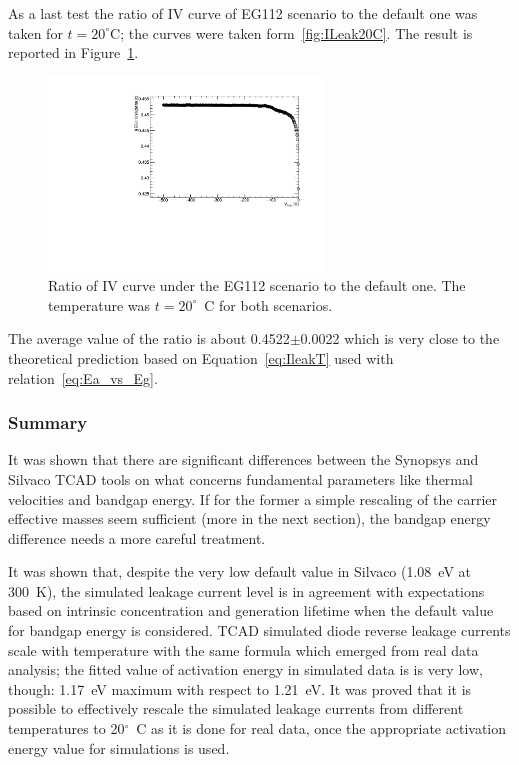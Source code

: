As  a last test the ratio of IV curve of EG112 scenario to the default one was taken for 
$t=20^{\circ}$C; the curves were taken form~\ref{fig:ILeak20C}. The result is reported in Figure~\ref{fig:EG112_to_default_T_20_Current_ratio}.

\begin{figure}[!htbp]
\centering
\includegraphics[width=0.65\textwidth]{EG112_to_default_T_20_Current_ratio.pdf}
\caption{\label{fig:EG112_to_default_T_20_Current_ratio}Ratio of IV curve under the EG112 
scenario to the default one. The temperature was $t=20^{\circ}$~C for both scenarios.}
\end{figure}

The average value of the ratio is about 0.4522$\pm$0.0022 which is very close to the theoretical 
prediction based on Equation~\ref{eq:IleakT} used with relation~\ref{eq:Ea_vs_Eg}.


\subsubsection{Summary}
It was shown that there are significant differences between the Synopsys and Silvaco TCAD tools 
on what concerns fundamental parameters like thermal velocities and bandgap energy. 
If for the former a simple rescaling of the carrier effective masses seem sufficient (more in 
the next section), the bandgap energy difference needs a more careful treatment. 

It was shown that, despite the very low default value in Silvaco (1.08~eV at 300~K), the 
simulated leakage current level is in agreement with expectations based on intrinsic concentration 
and generation lifetime when the default value for bandgap energy is considered. TCAD simulated diode reverse leakage currents scale with temperature 
with the same formula which emerged from real data analysis; the fitted value of activation energy 
in simulated data is is very low, though: 1.17~eV maximum with respect to 1.21~eV. 
It was proved that it is possible to effectively rescale the simulated leakage currents from different temperatures to 20$^{\circ}$~C as it is done for real data, once the appropriate activation energy 
value for simulations is used.

